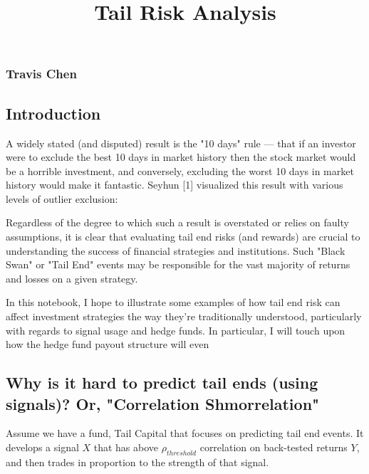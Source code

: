 \documentclass[11pt]{article}
\title{Tail Risk Analysis}
\begin{document}
    
    
    \maketitle
    
    

    
    \subsubsection{Travis Chen}\label{travis-chen}

    \subsection{Introduction}\label{introduction}

    A widely stated (and disputed) result is the "10 days" rule --- that if
an investor were to exclude the best 10 days in market history then the
stock market would be a horrible investment, and conversely, excluding
the worst 10 days in market history would make it fantastic. Seyhun
{[}1{]} visualized this result with various levels of outlier exclusion:

    

    Regardless of the degree to which such a result is overstated or relies
on faulty assumptions, it is clear that evaluating tail end risks (and
rewards) are crucial to understanding the success of financial
strategies and institutions. Such "Black Swan" or "Tail End" events may
be responsible for the vast majority of returns and losses on a given
strategy.

In this notebook, I hope to illustrate some examples of how tail end
risk can affect investment strategies the way they're traditionally
understood, particularly with regards to signal usage and hedge funds.
In particular, I will touch upon how the hedge fund payout structure
will even

    \subsection{Why is it hard to predict tail ends (using signals)? Or,
"Correlation
Shmorrelation"}\label{why-is-it-hard-to-predict-tail-ends-using-signals-or-correlation-shmorrelation}

    Assume we have a fund, Tail Capital that focuses on predicting tail end
events. It develops a signal \(X\) that has above \(\rho_{threshold}\)
correlation on back-tested returns \(Y\), and then trades in proportion
to the strength of that signal.
\end{document}
